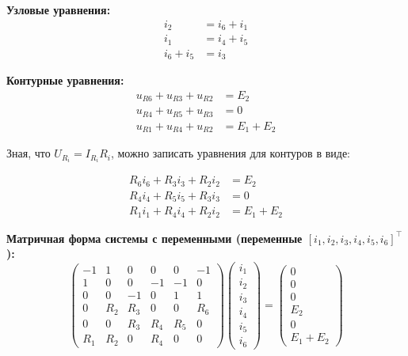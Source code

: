 
\textbf{Узловые уравнения:}
\begin{align}
    i_2 &= i_6 + i_1 \tag{a} \\
    i_1 &= i_4 + i_5 \tag{b} \\
    i_6 + i_5 &= i_3 \tag{c}
\end{align}

\textbf{Контурные уравнения:}
\begin{align}
    u_{R6} + u_{R3} + u_{R2} &= E_2 \tag{acd} \\
    u_{R4} + u_{R5} + u_{R3} &= 0 \tag{dbc} \\
    u_{R1} + u_{R4} + u_{R2} &= E_1 + E_2 \tag{abd}
\end{align}

Зная, что $U_{R_i}= I_{R_i} R_i$, можно записать уравнения для контуров в виде:

\begin{align}
    R_6 i_6 + R_3 i_3 + R_2 i_2 &= E_2 \tag{acd} \\
    R_4 i_4 + R_5 i_5 + R_3 i_3 &= 0 \tag{dbc} \\
    R_1 i_1 + R_4 i_4 + R_2 i_2 &= E_1 + E_2 \tag{abd}
\end{align}

\textbf{Матричная форма системы с переменными (переменные $[i_1, i_2, i_3, i_4, i_5, i_6]^\top$):}
$$\begin{pmatrix}
-1 &  1 &  0 &  0 &  0 & -1 \\
 1 &  0 &  0 & -1 & -1 &  0 \\
 0 &  0 & -1 &  0 &  1 &  1 \\
 0 & R_2 & R_3 &  0 &  0 & R_6 \\
 0 &  0 & R_3 & R_4 & R_5 &  0 \\
R_1 & R_2 &  0 & R_4 &  0 &  0
\end{pmatrix}
\begin{pmatrix}
i_1 \\
i_2 \\
i_3 \\
i_4 \\
 i_5 \\
i_6
\end{pmatrix}
=
\begin{pmatrix}
0 \\
0 \\
0 \\
E_2 \\
0 \\
E_1 + E_2
\end{pmatrix}$$

